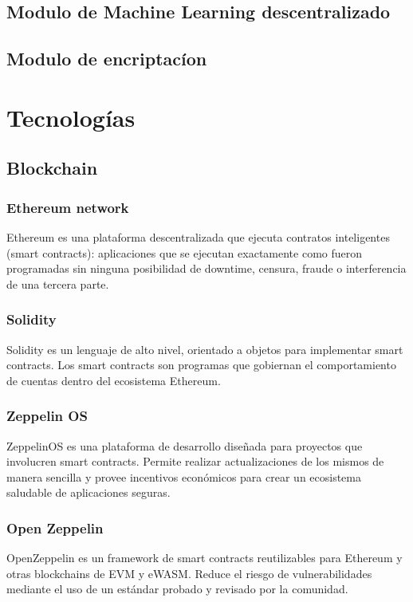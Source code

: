 \documentclass[
11pt, %
spanish, %
singlespacing, %
headsepline, %
]{MastersDoctoralThesis} %
\begin{document}
\section{Modulo de Machine Learning descentralizado}


\section{Modulo de encriptac\'ion}

\section{}


\chapter{Tecnolog\'ias}

\section{Blockchain}

\subsection{Ethereum network}
\parencite{Ethereum}
Ethereum es una plataforma descentralizada que ejecuta contratos inteligentes (smart contracts): aplicaciones que se ejecutan exactamente como fueron programadas sin ninguna posibilidad de downtime, censura, fraude o interferencia de una tercera parte.

\subsection{Solidity}
Solidity es un lenguaje de alto nivel, orientado a objetos para implementar smart contracts. Los smart contracts son programas que gobiernan el comportamiento de cuentas dentro del ecosistema Ethereum.


\subsection{Zeppelin OS}
ZeppelinOS es una plataforma de desarrollo diseñada para proyectos que involucren smart contracts. Permite realizar actualizaciones de los mismos de manera sencilla y provee incentivos económicos para crear un ecosistema saludable de aplicaciones seguras.

\subsection{Open Zeppelin}
OpenZeppelin es un framework de smart contracts reutilizables para Ethereum y otras blockchains de EVM y eWASM. Reduce el riesgo de vulnerabilidades mediante el uso de un estándar probado y revisado por la comunidad.
\end{document}
